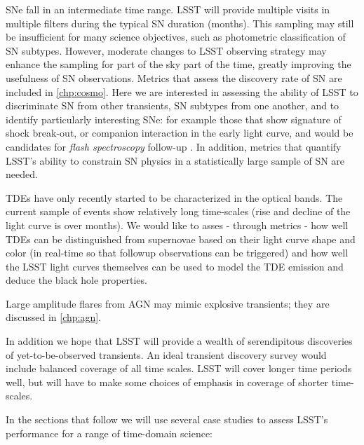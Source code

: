 SNe fall in an intermediate time range.  LSST will provide
multiple visits in multiple filters during the typical SN duration
(months).  This sampling may still be insufficient for many science
objectives, such as photometric classification of SN subtypes.
However, moderate changes to LSST
observing strategy may enhance the sampling for part of the sky part
of the time, greatly improving the usefulness of SN observations.
Metrics that assess the discovery rate of SN are included in
\autoref{chp:cosmo}.
Here we are interested in assessing the ability of
LSST to discriminate SN from other transients, SN subtypes from one
another, and to identify particularly interesting SNe: for example
those that show signature of shock break-out, or companion interaction
in the early light curve, and would be candidates for \emph{flash
spectroscopy} follow-up \citep[e.g.,][]{2014Natur.509..471G}.
In addition, metrics that
quantify LSST's ability to constrain SN physics in a statistically
large sample of SN are needed.

TDEs have only recently started to be characterized in the optical
bands. The current sample of events show relatively long
time-scales (rise and decline of the light curve is over months). We
would like to asses - through metrics - how well TDEs can be
distinguished from supernovae based on their light curve shape and
color (in real-time so that followup observations can be triggered)
and how well the LSST light curves themselves can be used to model the
TDE emission and deduce the black hole properties.

Large amplitude flares from AGN may mimic
explosive transients; they are discussed in \autoref{chp:agn}.

In addition we hope that LSST will provide a wealth of serendipitous
discoveries of yet-to-be-observed transients.  An ideal transient
discovery survey would include balanced coverage of all time scales. LSST
will cover longer time periods well, but will have to make some
choices of emphasis in coverage of shorter time-scales.

In the sections that follow we will use several case studies to assess
LSST's performance for a range of time-domain science:

